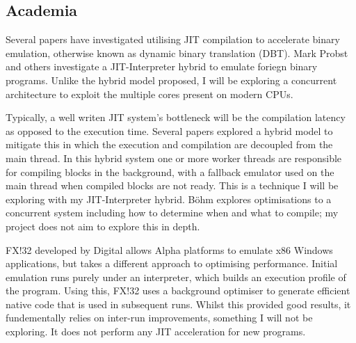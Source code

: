\subsection{Academia}

Several papers have investigated utilising JIT compilation to accelerate binary emulation, otherwise known as dynamic binary translation (DBT). Mark Probst \cite{mark-probst-dbt} and others \cite{nigel-jit} investigate a JIT-Interpreter hybrid to emulate foriegn binary programs. Unlike the hybrid model proposed, I will be exploring a concurrent architecture to exploit the multiple cores present on modern CPUs.

Typically, a well writen JIT system's bottleneck will be the compilation latency as opposed to the execution time. Several papers \cite{js-concurrent-trace, dynamic-compilation-early} explored a hybrid model to mitigate this in which the execution and compilation are decoupled from the main thread. In this hybrid system one or more worker threads are responsible for compiling blocks in the background, with a fallback emulator used on the main thread when compiled blocks are not ready. This is a technique I will be exploring with my JIT-Interpreter hybrid. Böhm \cite{igor-phd} explores optimisations to a concurrent system including how to determine when and what to compile; my project does not aim to explore this in depth.

FX!32 \cite{fx!32} developed by Digital allows Alpha platforms to emulate x86 Windows applications, but takes a different approach to optimising performance. Initial emulation runs purely under an interpreter, which builds an execution profile of the program. Using this, FX!32 uses a background optimiser to generate efficient native code that is used in subsequent runs. Whilst this provided good results, it fundementally relies on inter-run improvements, something I will not be exploring. It does not perform any JIT acceleration for new programs.